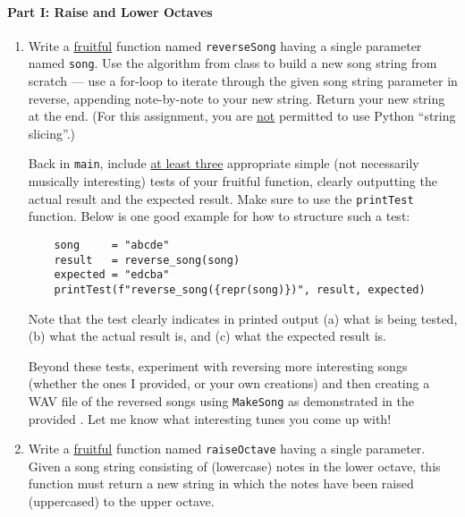 \documentclass[10pt]{article}
\begin{document}
  \paragraph{Part I: Raise and Lower Octaves}
  \vspace*{-10pt}
  \begin{enumerate}
    \item Write a \uline{fruitful} function named {\tt reverseSong} having a
        single parameter named {\tt song}.
        Use the algorithm from class to build a new song string from scratch
        --- use a for-loop to iterate through the given song string parameter
        in reverse, appending note-by-note to your new string.
        Return your new string at the end.
        (For this assignment, you are \uline{not} permitted to use Python
        ``string slicing''.)

        \vspace*{6pt}
        Back in {\tt main}, include \uline{at least three} appropriate simple
        (not necessarily musically interesting) tests of your fruitful
        function, clearly outputting the actual result and the expected result.
        Make sure to use the {\tt printTest} function.
        Below is one good example for how to structure such a test:
\begin{verbatim}
    song     = "abcde"
    result   = reverse_song(song)
    expected = "edcba"
    printTest(f"reverse_song({repr(song)})", result, expected)
\end{verbatim}
        Note that the test clearly indicates in printed output (a) what is
        being tested, (b) what the actual result is, and (c) what the 
        expected result is.

        \vspace*{6pt}
        Beyond these tests, experiment with reversing more interesting songs
        (whether the ones I provided, or your own creations) and then creating
        a WAV file of the reversed songs using {\tt MakeSong} as demonstrated
        in the provided \prog.
        Let me know what interesting tunes you come up with!
    \item Write a \uline{fruitful} function named {\tt raiseOctave} having a
        single parameter.
        Given a song string consisting of (lowercase) notes in the lower octave,
        this function must return a new string in which the notes have been
        raised (uppercased) to the upper octave.


\end{enumerate}
\end{document}
